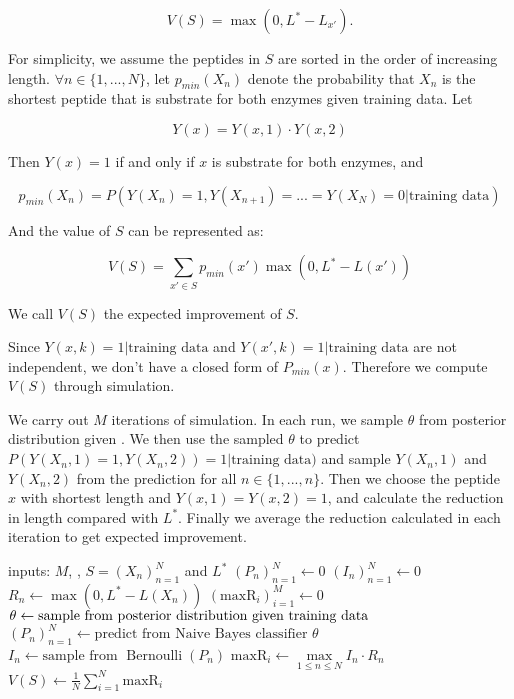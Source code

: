 \documentclass[12pt]{article}
\newcommand{\data}{\text{training data}}
\begin{document}
\begin{equation*}
V(S) = \max(0, L^*-L_{x'}).
\end{equation*}

For simplicity, we assume the peptides in $S$ are sorted in the order of increasing length. $\forall n\in\{1,...,N\}$, let $p_{min}(X_n)$ denote the probability that $X_n$ is the shortest peptide that is substrate for both enzymes given training data. Let

\begin{equation*}
Y(x) = Y(x,1)\cdot Y(x,2)
\end{equation*}

Then $Y(x) = 1$ if and only if $x$ is substrate for both enzymes, and

\begin{equation*}
p_{min}(X_n) = P(Y(X_n)=1, Y(X_{n+1})=...=Y(X_N)=0|\data)
\end{equation*}

And the value of $S$ can be represented as:

\begin{equation*}
V(S) = \sum_{x'\in S} p_{min}(x')\max(0,L^*-L(x'))
\end{equation*}

We call $V(S)$ the expected improvement of $S$.

Since $Y(x,k)=1|\data$ and $Y(x',k)=1|\data$ are not independent, we don't have a closed form of $P_{min}(x)$. Therefore we compute $V(S)$ through simulation.

We carry out $M$ iterations of simulation. In each run, we sample $\theta$ from posterior distribution given \data. We then use the sampled $\theta$ to predict $P(Y(X_n,1)=1,Y(X_n,2))=1|\data)$ and sample $Y(X_n,1)$ and $Y(X_n,2)$ from the prediction for all $n\in\{1,...,n\}$. Then we choose the peptide $x$ with shortest length and $Y(x,1)=Y(x,2)=1$, and calculate the reduction in length compared with $L^*$. Finally we average the reduction calculated in each iteration to get expected improvement.

\begin{algorithmic}[1]
\REQUIRE inputs: $M$, \data, $S=(X_n)_{n=1}^N$ and $L^*$
\STATE $(P_n)_{n=1}^N \gets 0$
\STATE $(I_n)_{n=1}^N \gets 0$
\STATE $R_n \gets \max(0,L^*-L(X_n))$
\ENDFOR
\STATE $(\text{maxR}_i)_{i=1}^M \gets 0$
\STATE $\theta \gets \text{sample from posterior distribution given \data}$
\STATE $(P_n)_{n=1}^N \gets \text{predict from Naive Bayes classifier }\theta$
\STATE $I_n \gets \text{sample from } \operatorname{Bernoulli}(P_n)$
\ENDFOR
\STATE $\text{maxR}_i \gets \max\limits_{1\leq n\leq N}I_n\cdot R_n$
\ENDFOR
\STATE $V(S)\gets \frac{1}{N}\sum_{i=1}^N\text{maxR}_i$
\end{algorithmic}
\end{document}
